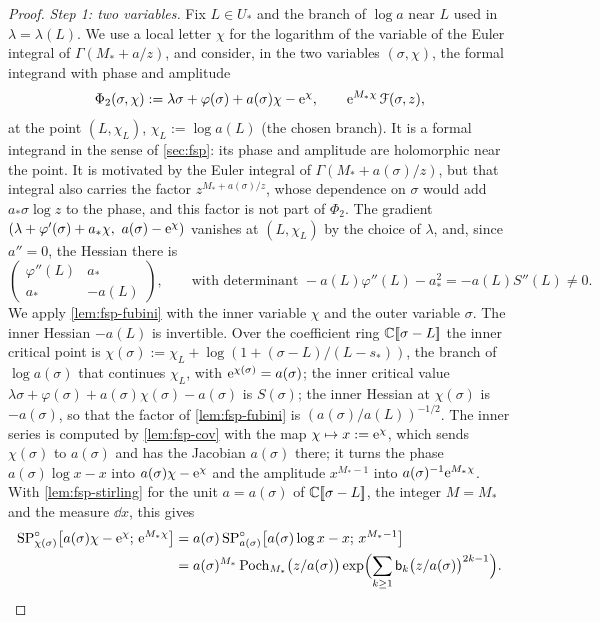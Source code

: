 \begin{proof}
\emph{Step 1: two variables.} Fix $L\in U_*$ and the branch of $\log a$ near $L$ used in $\lambda=\lambda(L)$. We use a local letter $\chi$ for the logarithm of the variable of the Euler integral of $\Gamma(M_*+a/z)$, and consider, in the two variables $(\sigma,\chi)$, the formal integrand with phase and amplitude
\[
\Phi_2(\sigma,\chi):=\lambda\sigma+\varphi(\sigma)+a(\sigma)\chi-\mathrm{e}^{\chi},\qquad \mathrm{e}^{M_*\chi}\,\mathcal{F}(\sigma,z),
\]
at the point $(L,\chi_L)$, $\chi_L:=\log a(L)$ (the chosen branch). It is a formal integrand in the sense of \cref{sec:fsp}: its phase and amplitude are holomorphic near the point. It is motivated by the Euler integral of $\Gamma(M_*+a(\sigma)/z)$, but that integral also carries the factor $z^{M_*+a(\sigma)/z}$, whose dependence on $\sigma$ would add $a_*\sigma\log z$ to the phase, and this factor is not part of $\Phi_2$. The gradient $(\lambda+\varphi'(\sigma)+a_*\chi,\ a(\sigma)-\re^{\chi})$ vanishes at $(L,\chi_L)$ by the choice of $\lambda$, and, since $a''=0$, the Hessian there is
\[
\begin{pmatrix}\varphi''(L)&a_*\\ a_*&-a(L)\end{pmatrix},\qquad\text{with determinant }-a(L)\varphi''(L)-a_*^2=-a(L)S''(L)\neq 0.
\]
We apply \cref{lem:fsp-fubini} with the inner variable $\chi$ and the outer variable $\sigma$. The inner Hessian $-a(L)$ is invertible. Over the coefficient ring $\mathbb{C}[\![ \sigma-L ]\!]$ the inner critical point is $\chi(\sigma):=\chi_L+\log(1+(\sigma-L)/(L-s_*))$, the branch of $\log a(\sigma)$ that continues $\chi_L$, with $\mathrm{e}^{\chi(\sigma)}=a(\sigma)$; the inner critical value $\lambda\sigma+\varphi(\sigma)+a(\sigma)\chi(\sigma)-a(\sigma)$ is $S(\sigma)$; the inner Hessian at $\chi(\sigma)$ is $-a(\sigma)$, so that the factor of \cref{lem:fsp-fubini} is $(a(\sigma)/a(L))^{-1/2}$. The inner series is computed by \cref{lem:fsp-cov} with the map $\chi\mapsto x:=\mathrm{e}^{\chi}$, which sends $\chi(\sigma)$ to $a(\sigma)$ and has the Jacobian $a(\sigma)$ there; it turns the phase $a(\sigma)\log x-x$ into $a(\sigma)\chi-\mathrm{e}^{\chi}$ and the amplitude $x^{M_*-1}$ into $a(\sigma)^{-1}\mathrm{e}^{M_*\chi}$. With \cref{lem:fsp-stirling} for the unit $a=a(\sigma)$ of $\mathbb{C}[\![ \sigma-L ]\!]$, the integer $M=M_*$ and the measure $\dd x$, this gives
\begin{align*}
\SPn_{\chi(\sigma)}\bigl[a(\sigma)\chi-\re^{\chi};\,\re^{M_*\chi}\bigr]&=a(\sigma)\,\SPn_{a(\sigma)}\bigl[a(\sigma)\log x-x;\,x^{M_*-1}\bigr]\\
&=a(\sigma)^{M_*}\,\mathrm{Poch}_{M_*}\bigl(z/a(\sigma)\bigr)\exp\Bigl(\sum_{k\geq 1}\bk_k\bigl(z/a(\sigma)\bigr)^{2k-1}\Bigr).

\end{align*}
\end{proof}
